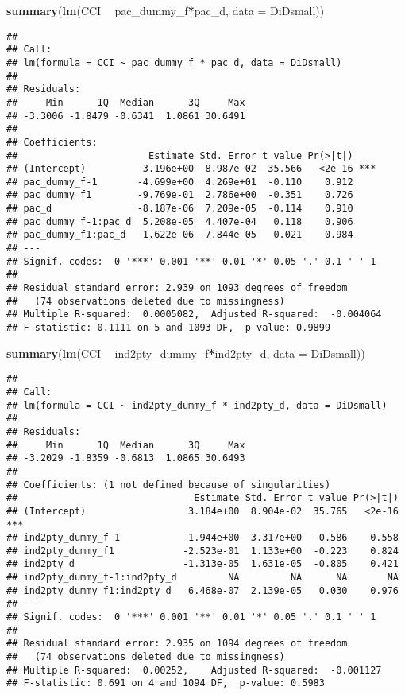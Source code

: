 \documentclass[]{article}
\newenvironment{Shaded}{\begin{snugshade}}{\end{snugshade}}
\newcommand{\KeywordTok}[1]{\textcolor[rgb]{0.13,0.29,0.53}{\textbf{#1}}}
\newcommand{\DataTypeTok}[1]{\textcolor[rgb]{0.13,0.29,0.53}{#1}}
\newcommand{\StringTok}[1]{\textcolor[rgb]{0.31,0.60,0.02}{#1}}
\newcommand{\OperatorTok}[1]{\textcolor[rgb]{0.81,0.36,0.00}{\textbf{#1}}}
\newcommand{\NormalTok}[1]{#1}
\begin{document}
\begin{Shaded}
\begin{Highlighting}[]
\KeywordTok{summary}\NormalTok{(}\KeywordTok{lm}\NormalTok{(CCI }\OperatorTok{~}\StringTok{ }\NormalTok{pac_dummy_f}\OperatorTok{*}\NormalTok{pac_d, }\DataTypeTok{data =}\NormalTok{ DiDsmall))}
\end{Highlighting}
\end{Shaded}

\begin{verbatim}
## 
## Call:
## lm(formula = CCI ~ pac_dummy_f * pac_d, data = DiDsmall)
## 
## Residuals:
##     Min      1Q  Median      3Q     Max 
## -3.3006 -1.8479 -0.6341  1.0861 30.6491 
## 
## Coefficients:
##                       Estimate Std. Error t value Pr(>|t|)    
## (Intercept)          3.196e+00  8.987e-02  35.566   <2e-16 ***
## pac_dummy_f-1       -4.699e+00  4.269e+01  -0.110    0.912    
## pac_dummy_f1        -9.769e-01  2.786e+00  -0.351    0.726    
## pac_d               -8.187e-06  7.209e-05  -0.114    0.910    
## pac_dummy_f-1:pac_d  5.208e-05  4.407e-04   0.118    0.906    
## pac_dummy_f1:pac_d   1.622e-06  7.844e-05   0.021    0.984    
## ---
## Signif. codes:  0 '***' 0.001 '**' 0.01 '*' 0.05 '.' 0.1 ' ' 1
## 
## Residual standard error: 2.939 on 1093 degrees of freedom
##   (74 observations deleted due to missingness)
## Multiple R-squared:  0.0005082,  Adjusted R-squared:  -0.004064 
## F-statistic: 0.1111 on 5 and 1093 DF,  p-value: 0.9899
\end{verbatim}

\begin{Shaded}
\begin{Highlighting}[]
\KeywordTok{summary}\NormalTok{(}\KeywordTok{lm}\NormalTok{(CCI }\OperatorTok{~}\StringTok{ }\NormalTok{ind2pty_dummy_f}\OperatorTok{*}\NormalTok{ind2pty_d, }\DataTypeTok{data =}\NormalTok{ DiDsmall))}
\end{Highlighting}
\end{Shaded}

\begin{verbatim}
## 
## Call:
## lm(formula = CCI ~ ind2pty_dummy_f * ind2pty_d, data = DiDsmall)
## 
## Residuals:
##     Min      1Q  Median      3Q     Max 
## -3.2029 -1.8359 -0.6813  1.0865 30.6493 
## 
## Coefficients: (1 not defined because of singularities)
##                               Estimate Std. Error t value Pr(>|t|)    
## (Intercept)                  3.184e+00  8.904e-02  35.765   <2e-16 ***
## ind2pty_dummy_f-1           -1.944e+00  3.317e+00  -0.586    0.558    
## ind2pty_dummy_f1            -2.523e-01  1.133e+00  -0.223    0.824    
## ind2pty_d                   -1.313e-05  1.631e-05  -0.805    0.421    
## ind2pty_dummy_f-1:ind2pty_d         NA         NA      NA       NA    
## ind2pty_dummy_f1:ind2pty_d   6.468e-07  2.139e-05   0.030    0.976    
## ---
## Signif. codes:  0 '***' 0.001 '**' 0.01 '*' 0.05 '.' 0.1 ' ' 1
## 
## Residual standard error: 2.935 on 1094 degrees of freedom
##   (74 observations deleted due to missingness)
## Multiple R-squared:  0.00252,    Adjusted R-squared:  -0.001127 
## F-statistic: 0.691 on 4 and 1094 DF,  p-value: 0.5983
\end{verbatim}
\end{document}
